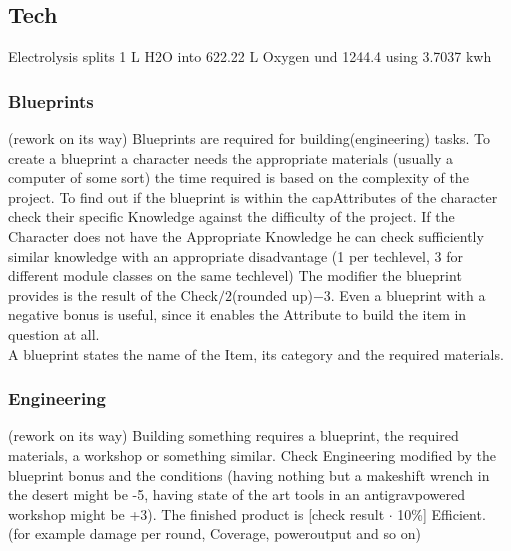     \subsection{Tech}\label{subsec:tech}
    Electrolysis splits 1 L H2O into 622.22 L Oxygen und 1244.4 using 3.7037 kwh\\
    \subsubsection{Blueprints}
(rework on its way)
    Blueprints are required for building(engineering) tasks.
    To create a blueprint a character needs the appropriate materials
    (usually a computer of some sort) the time required is based on the complexity of the project.
    To find out if the
    blueprint is within the capAttributes of the character check their specific Knowledge against the difficulty of the
    project.
    If the Character does not have the Appropriate Knowledge he can check sufficiently similar knowledge with
    an appropriate disadvantage (1 per techlevel, 3 for different module classes on the same techlevel)
    The modifier the blueprint provides is the result of the Check\(/2\)(rounded up)\(-3\).
    Even a blueprint with a negative bonus is useful, since it enables the Attribute to build the item in question at all.\\
    A blueprint states the name of the Item, its category and the required materials.\vspace{1.5cm}
    \subsubsection{Engineering}
(rework on its way)
    Building something requires a blueprint, the required materials, a workshop or something similar.
    Check Engineering
    modified by the blueprint bonus and the conditions (having nothing but a makeshift wrench in the desert might be -5, having state of the art
    tools in an antigravpowered workshop might be +3).
    The finished product is [check result \(\cdot\) 10\%] Efficient.
    (for example damage per round, Coverage, poweroutput and so on)\vspace{1.5cm}